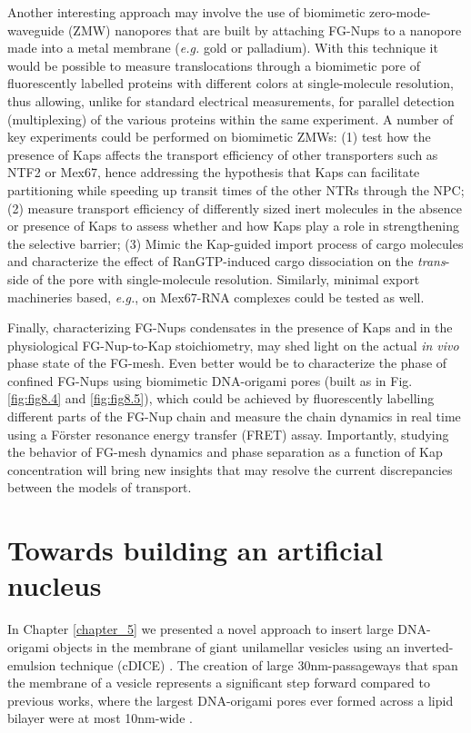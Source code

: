 \noindent Another interesting approach may involve the use of biomimetic zero-mode-wave\-guide (ZMW) nanopores \cite{Klughammer2021} that are built by attaching FG-Nups to a nanopore made into a metal membrane (\emph{e.g.} gold or palladium). With this technique it would be possible to measure translocations through a biomimetic pore of fluorescently labelled proteins with different colors at  single-molecule resolution, thus allowing, unlike for standard electrical measurements, for parallel detection (multiplexing) of the various proteins within the same experiment. A number of key experiments could be performed on biomimetic ZMWs: (1) test how the presence of Kaps affects the transport efficiency of other transporters such as NTF2 or Mex67, hence addressing the hypothesis that Kaps can facilitate partitioning while speeding up transit times of the other NTRs through the NPC; (2) measure transport efficiency of differently sized inert molecules in the absence or presence of Kaps to assess whether and how Kaps play a role in strengthening the selective barrier; (3) Mimic the Kap-guided import process of cargo molecules and characterize the effect of RanGTP-induced cargo dissociation on the \emph{trans}-side of the pore with single-molecule resolution. Similarly, minimal export machineries based, \emph{e.g.}, on Mex67-RNA complexes could be tested as well.

Finally, characterizing FG-Nups condensates in the presence of Kaps and in the physiological FG-Nup-to-Kap stoichiometry, may shed light on the actual \emph{in vivo} phase state of the FG-mesh. Even better would be to characterize the phase of confined FG-Nups using biomimetic DNA-origami pores (built as in Fig.\ref{fig:fig8.4} and \ref{fig:fig8.5}), which could be achieved by fluorescently labelling different parts of the FG-Nup chain and measure the chain dynamics in real time using a F\"{o}rster resonance energy transfer (FRET) assay. Importantly, studying the behavior of FG-mesh dynamics and phase separation as a function of Kap concentration will bring new insights that may resolve the current discrepancies between the models of transport.

\section{Towards building an artificial nucleus}
In Chapter \ref{chapter_5} we presented a novel approach to insert large DNA-origami objects in the membrane of giant unilamellar vesicles using an inverted-emulsion technique (cDICE) \cite{Fragasso2021a}. The creation of large 30nm-passageways that span the membrane of a vesicle represents a significant step forward compared to previous works, where the largest DNA-origami pores ever formed across a lipid bilayer were at most 10nm-wide \cite{Iwabuchi2021,Thomsen2019}.

